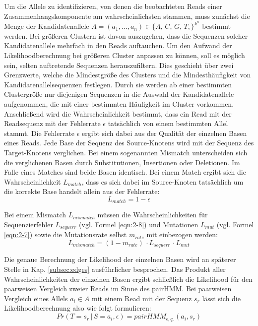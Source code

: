 Um die Allele zu identifizieren, von denen die beobachteten Reads einer Zusammenhangskomponente am wahrscheinlichsten stammen, muss zunächst die Menge der Kandidatenallele $A=(a_{1}, \dots, a_{n}) \in \{A,\,C,\,G,\,T,\}^{k^n}$ bestimmt werden. Bei größeren Clustern ist davon auszugehen, dass die Sequenzen solcher Kandidatenallele mehrfach in den Reads auftauchen. Um den Aufwand der Likelihoodberechnung bei größeren Cluster anpassen zu können, soll es möglich sein, selten auftretende Sequenzen herauszufiltern. Dies geschieht über zwei Grenzwerte, welche die Mindestgröße des Clusters und die Mindesthäufigkeit von Kandidatenallelsequenzen festlegen. Durch sie werden ab einer bestimmten Clustergröße nur diejenigen Sequenzen in die Auswahl der Kandidatenallele aufgenommen, die mit einer bestimmten Häufigkeit im Cluster vorkommen.\\

Anschließend wird die Wahrscheinlichkeit bestimmt, dass ein Read mit der Readsequenz mit der Fehlerrate $\epsilon$ tatsächlich von einem bestimmten Allel stammt. Die Fehlerrate $\epsilon$ ergibt sich dabei aus der Qualität der einzelnen Basen eines Reads. Jede Base der Sequenz des Source-Knotens wird mit der Sequenz des Target-Knotens verglichen. Bei einem sogenannten Mismatch unterscheiden sich die verglichenen Basen durch Substitutionen, Insertionen oder Deletionen. Im Falle eines Matches sind beide Basen identisch. Bei einem Match ergibt sich die Wahrscheinlichkeit $L_{match}$, dass es sich dabei im Source-Knoten tatsächlich um die korrekte Base handelt allein aus der Fehlerrate:
\begin{equation} \label{eqn:2-13}
\tag{2-13}
L_{match} = 1 - \epsilon
\end{equation}

Bei einem Mismatch $L_{mismatch}$ müssen die Wahrscheinlichkeiten für Sequenzierfehler $L_{sequerr}$ (vgl. Formel \eqref{eqn:2-8}) und Mutationen $L_{mut}$ (vgl. Formel \eqref{eqn:2-7}) sowie die Mutationsrate selbst $m_{rate}$ mit einbezogen werden: 
\begin{equation} \label{eqn:2-14}
\tag{2-14}
L_{mismatch} = (1 - m_{rate}) \, \cdotp L_{sequerr} \, \cdotp L_{mut}
\end{equation}

Die genaue Berechnung der Likelihood der einzelnen Basen wird an späterer Stelle in Kap. \ref{subsec:edges} ausführlicher besprochen. Das Produkt aller Wahrscheinlichkeiten der einzelnen Basen ergibt schließlich die Likelihood für den paarweisen Vergleich zweier Reads im Sinne des pairHMM. Bei paarweisen Vergleich eines Allels $a_{i} \in A $ mit einem Read mit der Sequenz $s_{r}$ lässt sich die Likelihoodberechnung also wie folgt formulieren:
\begin{equation} \label{eqn:2-15}
\tag{2-15}
Pr(T=s_{r} \, | \, S=a_{i}, \epsilon) = pairHMM_{\epsilon,q_{r}}(a_{i}, s_{r})
\end{equation}



